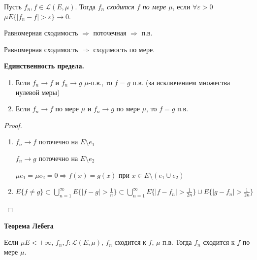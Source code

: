 \begin{definition}
    Пусть $f_n, f\in \mathcal{L}(E, \mu)$. Тогда \textit{$f_n$ сходится $f$ по мере $\mu$}, если 
    $\forall \varepsilon > 0$ $\mu E\{|f_n - f|> \varepsilon\}\rightarrow 0$.
\end{definition}

\begin{remark}
    Равномерная сходимость $\Rightarrow$ поточечная $\Rightarrow$ п.в.

    Равномерная сходимость $\Rightarrow$ сходимость по мере.
\end{remark}

\begin{statement}
    \textbf{Единственность предела.}

    \begin{enumerate}
        \item Если $f_n\rightarrow f$ и $f_n\rightarrow g$ $\mu$-п.в., то $f=g$ п.в.
        (за исключением множества нулевой меры)

        \item Если $f_n\rightarrow f$ по мере $\mu$ и $f_n\rightarrow g$ по мере $\mu$, то $f=g$ п.в.
    \end{enumerate}
\end{statement}

\begin{proof}~
    \begin{enumerate}
        \item $f_n\rightarrow f$ поточечно на $E\setminus e_1$
        
        $f_n\rightarrow g$ поточечно на $E\setminus e_2$

        $\mu e_1=\mu e_2=0\Rightarrow f(x)=g(x)$ при $x\in E \setminus (e_1 \cup e_2)$

        \item $E\{f\not = g\}\subset \bigcup\limits_{n=1}^\infty E\{|f - g|> \frac{1}{n}\}\subset
        \bigcup\limits_{n=1}^\infty E\{|f - f_n|> \frac{1}{2n}\}\cup E\{|g - f_n|> \frac{1}{2n}\}$
    \end{enumerate}
\end{proof}

\begin{theorem}
    \textbf{Теорема Лебега}

    Если $\mu E<+\infty$, $f_n, f:\mathcal{L}(E, \mu)$, $f_n$ сходится к $f$,
    $\mu$-п.в. Тогда $f_n$ сходится к $f$ по мере $\mu$.
\end{theorem}


